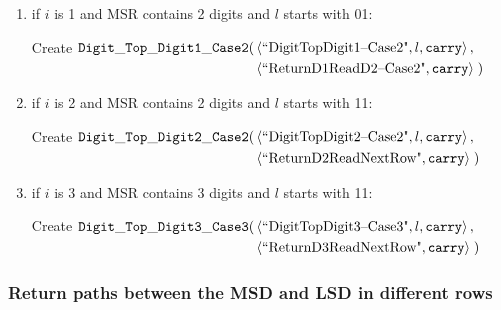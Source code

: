 \begin{itemize}
\begin{enumerate}[label=\alph*)]
                \item if $i$ is 1 and MSR contains 2 digits and $l$ starts with 01:

                Create
                $\begin{aligned}[t]
                    {\tt Digit\_Top\_Digit1\_Case2}(& \left \langle \text{``DigitTopDigit1--Case2"}, l, {\tt carry} \right\rangle, & \\
                                     & \left \langle \text{``ReturnD1ReadD2--Case2"},    {\tt carry} \right\rangle \;)
                \end{aligned}$
                \vspace{.5cm}


                \item if $i$ is 2 and MSR contains 2 digits and $l$ starts with 11:

                Create
                $\begin{aligned}[t]
                    {\tt Digit\_Top\_Digit2\_Case2}(& \left \langle \text{``DigitTopDigit2--Case2"}, l, {\tt carry} \right\rangle, & \\
                                     & \left \langle \text{``ReturnD2ReadNextRow"},     {\tt carry} \right\rangle \;)
                \end{aligned}$
                \vspace{.5cm}


                \item if $i$ is 3 and MSR contains 3 digits and $l$ starts with 11:

                Create
                $\begin{aligned}[t]
                    {\tt Digit\_Top\_Digit3\_Case3}(& \left \langle \text{``DigitTopDigit3--Case3"}, l, {\tt carry} \right\rangle, & \\
                                         & \left \langle \text{``ReturnD3ReadNextRow"},     {\tt carry} \right\rangle \;)
                \end{aligned}$
                \vspace{.5cm}


            \end{enumerate}

        \end{itemize}
    \vspace{1cm}



    \subsubsection{Return paths between the MSD and LSD in different rows}

